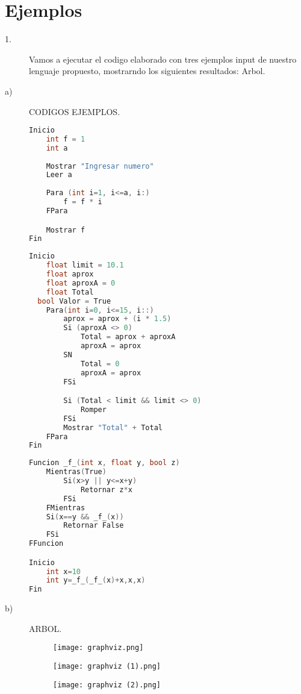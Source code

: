 \documentclass{article}
\begin{document}
\section{Ejemplos}
\begin{description}
\item[1. ] Vamos a ejecutar el codigo elaborado con tres ejemplos input de nuestro lenguaje propuesto, mostrarndo los siguientes resultados: Arbol. 

\item[a) ] CODIGOS EJEMPLOS.
\begin{lstlisting}[language=C++, caption=Ejemlo 1]
Inicio
	int f = 1
	int a
	
	Mostrar "Ingresar numero"
	Leer a
	
	Para (int i=1, i<=a, i:)
		f = f * i
	FPara

	Mostrar f
Fin
\end{lstlisting}
\begin{lstlisting}[language=C++, caption=Ejemlo 2]
Inicio
	float limit = 10.1 
	float aprox
	float aproxA = 0
	float Total
  bool Valor = True
	Para(int i=0, i<=15, i::)
		aprox = aprox + (i * 1.5)
		Si (aproxA <> 0)
			Total = aprox + aproxA
			aproxA = aprox
		SN
			Total = 0
			aproxA = aprox
		FSi

		Si (Total < limit && limit <> 0)
			Romper
		FSi
		Mostrar "Total" + Total
	FPara
Fin
\end{lstlisting}
\begin{lstlisting}[language=C++, caption=Ejemlo 3]
Funcion _f_(int x, float y, bool z)
	Mientras(True)
		Si(x>y || y<=x+y)
			Retornar z*x
		FSi
	FMientras
	Si(x==y && _f_(x))
		Retornar False
	FSi
FFuncion

Inicio
	int x=10
	int y=_f_(_f_(x)+x,x,x)
Fin
\end{lstlisting}

\item[b) ] ARBOL.
\begin{figure}[htbp]
        \centering
        \texttt{[image: graphviz.png]}
        \label{fig:ejemplo}
\end{figure}

\begin{figure}[htbp]
        \centering
        \texttt{[image: graphviz (1).png]}
        \label{fig:ejemplo}
\end{figure}

\begin{figure}[htbp]
        \centering
        \texttt{[image: graphviz (2).png]}
        \label{fig:ejemplo}
\end{figure}

\end{description}
\end{document}
